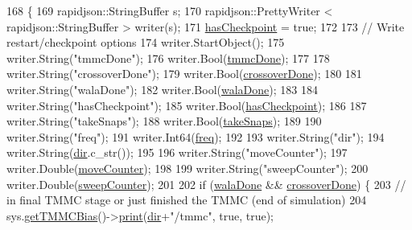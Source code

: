 \begin{DoxyCode}
168                                                                                                            
                      \{
169     rapidjson::StringBuffer s;
170     rapidjson::PrettyWriter < rapidjson::StringBuffer > writer(s);
171     \hyperlink{classcheckpoint_aa75f306fcb0c2360d948fa3a61adfed5}{hasCheckpoint} = \textcolor{keyword}{true};
172 
173     \textcolor{comment}{// Write restart/checkpoint options}
174     writer.StartObject();
175     writer.String(\textcolor{stringliteral}{"tmmcDone"});
176     writer.Bool(\hyperlink{classcheckpoint_acbe0c62aa82735741a9f396827966823}{tmmcDone});
177 
178     writer.String(\textcolor{stringliteral}{"crossoverDone"});
179     writer.Bool(\hyperlink{classcheckpoint_a4f13612ea6d376bb327295bfce3a70c5}{crossoverDone});
180 
181     writer.String(\textcolor{stringliteral}{"walaDone"});
182     writer.Bool(\hyperlink{classcheckpoint_aab066479e2ca6656d0031dd46a2fc1a5}{walaDone});
183 
184     writer.String(\textcolor{stringliteral}{"hasCheckpoint"});
185     writer.Bool(\hyperlink{classcheckpoint_aa75f306fcb0c2360d948fa3a61adfed5}{hasCheckpoint});
186 
187     writer.String(\textcolor{stringliteral}{"takeSnaps"});
188     writer.Bool(\hyperlink{classcheckpoint_a685226e8bae8084937f73f65c326c362}{takeSnaps});
189 
190     writer.String(\textcolor{stringliteral}{"freq"});
191     writer.Int64(\hyperlink{classcheckpoint_a11a2d78eb0bf6045b659a4d18b53da44}{freq});
192 
193     writer.String(\textcolor{stringliteral}{"dir"});
194     writer.String(\hyperlink{classcheckpoint_a0e0f999ee8e0b09541e9131baa8a591d}{dir}.c\_str());
195 
196     writer.String(\textcolor{stringliteral}{"moveCounter"});
197     writer.Double(\hyperlink{classcheckpoint_a5ab49a355714da4874aba00eb03f701d}{moveCounter});
198 
199     writer.String(\textcolor{stringliteral}{"sweepCounter"});
200     writer.Double(\hyperlink{classcheckpoint_ad011ddbca1ea708321335b1b3ac67e07}{sweepCounter});
201 
202     \textcolor{keywordflow}{if} (\hyperlink{classcheckpoint_aab066479e2ca6656d0031dd46a2fc1a5}{walaDone} && \hyperlink{classcheckpoint_a4f13612ea6d376bb327295bfce3a70c5}{crossoverDone}) \{
203         \textcolor{comment}{// in final TMMC stage or just finished the TMMC (end of simulation)}
204         sys.\hyperlink{classsim_system_aa31d40c91cb50f143a9613d362798887}{getTMMCBias}()->\hyperlink{classtmmc_ad49e147dc88b3e1c2975269598f94327}{print}(\hyperlink{classcheckpoint_a0e0f999ee8e0b09541e9131baa8a591d}{dir}+\textcolor{stringliteral}{"/tmmc"}, \textcolor{keyword}{true}, \textcolor{keyword}{true});

\end{DoxyCode}
